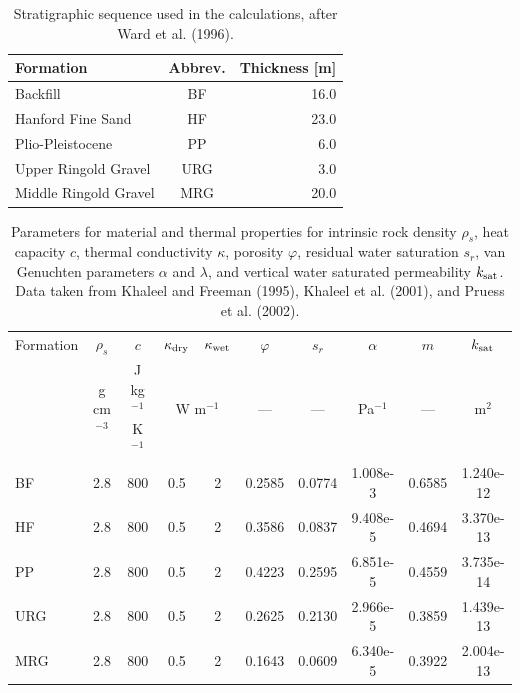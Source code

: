 \begin{table}[H]\centering
\caption{Stratigraphic sequence used in the calculations, after Ward et al. (1996).}\label{t1}

\vspace{3mm}

\begin{tabular}{lcr}
\toprule
Formation & Abbrev. & Thickness [m]\\
\midrule
Backfill & BF & 16.0\\
Hanford Fine Sand & HF & 23.0\\
Plio-Pleistocene & PP & 6.0\\
Upper Ringold Gravel & URG & 3.0\\
Middle Ringold Gravel & MRG & 20.0\\
\bottomrule
\end{tabular}
\end{table}

\begin{table}[H]\centering
\caption{Parameters for material and thermal properties for intrinsic rock density $\rho_s$, heat capacity $c$, thermal conductivity $\kappa$, porosity $\varphi$, residual water saturation $s_r$, van Genuchten parameters $\alpha$ and $\lambda$, and vertical water saturated permeability $k_{\rm sat}$. Data taken from Khaleel and Freeman (1995), Khaleel et al. (2001), and Pruess et al. (2002).}\label{t2}

\vspace{3mm}

\begin{tabular}{lccccccccc}
\toprule
Formation & $\rho_s$ & $c$ & $\kappa_{\rm dry}$ & $\kappa_{\rm wet}$ & $\varphi$ & $s_r$ & $\alpha$ & $m$ & $k_{\rm sat}$\\
& g cm$^{-3}$ & J kg$^{-1}$ K$^{-1}$ & \multicolumn{2}{c}{W m$^{-1}$} & --- & --- & Pa$^{-1}$ & --- & m$^2$\\
\midrule
BF  & 2.8 & 800 & 0.5 & 2 & 0.2585 & 0.0774 & 1.008e-3 & 0.6585  &1.240e-12\\
HF  & 2.8 & 800 & 0.5 & 2 & 0.3586 & 0.0837 & 9.408e-5 & 0.4694  &3.370e-13\\
PP  & 2.8 & 800 & 0.5 & 2 & 0.4223 & 0.2595 & 6.851e-5 & 0.4559  &3.735e-14\\
URG & 2.8 & 800 & 0.5 & 2 & 0.2625 & 0.2130 & 2.966e-5 & 0.3859  &1.439e-13\\
MRG & 2.8 & 800 & 0.5 & 2 & 0.1643 & 0.0609 & 6.340e-5 & 0.3922  &2.004e-13\\
\bottomrule
\end{tabular}
\end{table}

